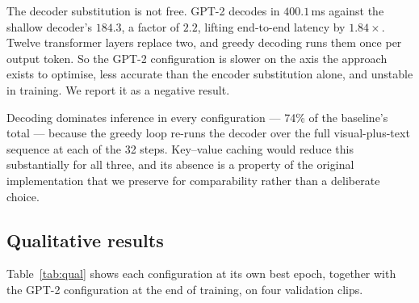 \documentclass[10pt,twocolumn,letterpaper]{article}
\begin{document}
The decoder substitution is not free. GPT-2 decodes in $400.1$\,ms against the shallow decoder's
$184.3$, a factor of $2.2$, lifting end-to-end latency by $1.84\times$. Twelve transformer layers
replace two, and greedy decoding runs them once per output token. So the GPT-2 configuration is
slower on the axis the approach exists to optimise, less accurate than the encoder substitution
alone, and unstable in training. We report it as a negative result.

Decoding dominates inference in every configuration --- 74\% of the baseline's total --- because
the greedy loop re-runs the decoder over the full visual-plus-text sequence at each of the 32
steps. Key--value caching would reduce this substantially for all three, and its absence is a
property of the original implementation that we preserve for comparability rather than a
deliberate choice.

\subsection{Qualitative results}

Table~\ref{tab:qual} shows each configuration at its own best epoch, together with the GPT-2
configuration at the end of training, on four validation clips.
\end{document}
